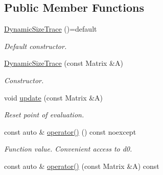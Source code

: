 \subsection*{Public Member Functions}
\begin{DoxyCompactItemize}
\item 
\hypertarget{structRFFGen_1_1LinearAlgebra_1_1DynamicSizeTrace_aef3f5b019aaf94d246487329a2744520}{\hyperlink{structRFFGen_1_1LinearAlgebra_1_1DynamicSizeTrace_aef3f5b019aaf94d246487329a2744520}{Dynamic\-Size\-Trace} ()=default}\label{structRFFGen_1_1LinearAlgebra_1_1DynamicSizeTrace_aef3f5b019aaf94d246487329a2744520}

\begin{DoxyCompactList}\small\item\em Default constructor. \end{DoxyCompactList}\item 
\hyperlink{structRFFGen_1_1LinearAlgebra_1_1DynamicSizeTrace_a0bf007bfd0ab5add26f3033fd4ac54f6}{Dynamic\-Size\-Trace} (const Matrix \&A)
\begin{DoxyCompactList}\small\item\em Constructor. \end{DoxyCompactList}\item 
\hypertarget{structRFFGen_1_1LinearAlgebra_1_1DynamicSizeTrace_a3bebec000fd519643df2d2e0dd2d18ab}{void \hyperlink{structRFFGen_1_1LinearAlgebra_1_1DynamicSizeTrace_a3bebec000fd519643df2d2e0dd2d18ab}{update} (const Matrix \&A)}\label{structRFFGen_1_1LinearAlgebra_1_1DynamicSizeTrace_a3bebec000fd519643df2d2e0dd2d18ab}

\begin{DoxyCompactList}\small\item\em Reset point of evaluation. \end{DoxyCompactList}\item 
\hypertarget{structRFFGen_1_1LinearAlgebra_1_1DynamicSizeTrace_ab6a92df0916c49de8ca6ccfb4c7da0ef}{const auto \& \hyperlink{structRFFGen_1_1LinearAlgebra_1_1DynamicSizeTrace_ab6a92df0916c49de8ca6ccfb4c7da0ef}{operator()} () const noexcept}\label{structRFFGen_1_1LinearAlgebra_1_1DynamicSizeTrace_ab6a92df0916c49de8ca6ccfb4c7da0ef}

\begin{DoxyCompactList}\small\item\em Function value. Convenient access to d0. \end{DoxyCompactList}\item 
\hypertarget{structRFFGen_1_1LinearAlgebra_1_1DynamicSizeTrace_ac091a5832c724173d7bb4477b067cfe1}{const auto \& \hyperlink{structRFFGen_1_1LinearAlgebra_1_1DynamicSizeTrace_ac091a5832c724173d7bb4477b067cfe1}{operator()} (const Matrix \&A) const }\label{structRFFGen_1_1LinearAlgebra_1_1DynamicSizeTrace_ac091a5832c724173d7bb4477b067cfe1}


\end{DoxyCompactItemize}
